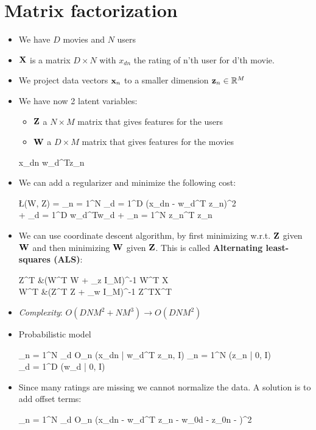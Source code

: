 
\section{Matrix factorization}
\begin{itemize}
	\item We have $D$ movies and $N$ users
	\item $\mathbf{X}$ is a matrix $D \times N$ with $x_{dn}$ the rating of n'th user for d'th movie.
	\item We project data vectors $\mathbf{x}_n$ to a smaller dimension $\mathbf{z}_n \in \Bbb R^M$
	\item We have now 2 latent variables:
	\begin{itemize}
		\item $\mathbf{Z}$ a $N \times M$ matrix that gives features for the users
	 	\item $\mathbf{W}$ a $D \times M$ matrix that gives features for the movies
	 \end{itemize} 
	 \begin{myalign*}
	     x_{dn} \approx \*w_d^T\*z_n
	 \end{myalign*}
	 \item We can add a regularizer and minimize the following cost:
	 \begin{myalign*}
	     \L(\*W, \*Z) =  \sum_{n = 1}^N \sum_{d = 1}^D (x_{dn} - \*w_d^T \*z_n)^2 \\ +  \sum_{d = 1}^D \*w_d^T\*w_d +  \sum_{n = 1}^N \*z_n^T \*z_n
	 \end{myalign*}
	 \item We can use coordinate descent algorithm, by first minimizing w.r.t. $\mathbf{Z}$ given $\mathbf{W}$ and then minimizing $\mathbf{W}$ given $\mathbf{Z}$. This is called \textbf{Alternating least-squares (ALS)}:
	 \begin{myalign*}
	     \*Z^T &\leftarrow (\*W^T \*W + \lambda_z \*I_M)^{-1} \*W^T \*X \\
	     \*W^T &\leftarrow (\*Z^T \*Z + \lambda_w \*I_M)^{-1} \*Z^T\*X^T
	 \end{myalign*}
	 \item \textit{Complexity}: $O(D N M^2 + N M^3) \rightarrow O(D N M^2)$
	 \item Probabilistic model
	 \begin{myalign*}
	     \prod_{n = 1}^N \prod_{d \in O_n} \N(x_{dn} | \*w_d^T \*z_n, I) 
	     \times \prod_{n = 1}^N \N(\*z_n | 0,  I) \\
	     \times \prod_{d = 1}^D \N(\*w_d | 0,  I)
	 \end{myalign*}

	 \item Since many ratings are missing we cannot normalize the data. A solution is to add offset terms:
	 \begin{myalign*}
	      \sum_{n = 1}^N \sum_{d \in O_n} (x_{dn} - \*w_d^T \*z_n - w_{0d} - z_{0n} - \mu)^2
	 \end{myalign*}
\end{itemize}

